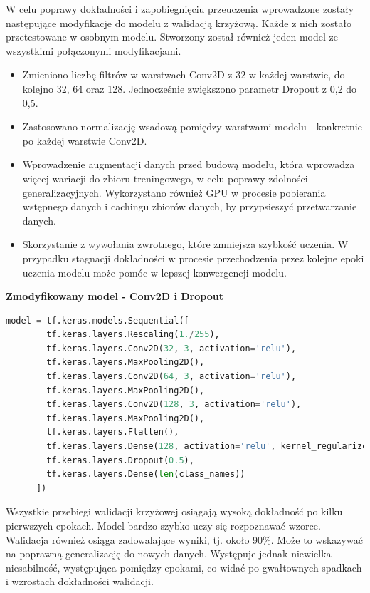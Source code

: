 W celu poprawy dokładności i zapobiegnięciu przeuczenia wprowadzone
zostały następujące modyfikacje do modelu z walidacją krzyżową.
Każde z nich zostało przetestowane w osobnym modelu.
Stworzony został również jeden model ze wszystkimi połączonymi modyfikacjami. 
\begin{itemize}[label=-,labelsep=0.4cm,leftmargin=0.6cm]
    \item Zmieniono liczbę filtrów w warstwach Conv2D z 32 w każdej warstwie, do kolejno 32, 64 oraz 128.
		Jednocześnie zwiększono parametr Dropout z 0,2 do 0,5.
    \item Zastosowano normalizację wsadową pomiędzy warstwami modelu - konkretnie po każdej warstwie Conv2D.
    \item Wprowadzenie augmentacji danych przed budową modelu, która wprowadza więcej wariacji do zbioru treningowego,
		w celu poprawy zdolności generalizacyjnych.
		Wykorzystano również GPU w procesie pobierania wstępnego danych i cachingu zbiorów danych, by przypsieszyć przetwarzanie danych.
	\item Skorzystanie z wywołania zwrotnego, które zmniejsza szybkość uczenia.
		W przypadku stagnacji dokładności w procesie przechodzenia przez kolejne epoki uczenia modelu
		może pomóc w lepszej konwergencji modelu.
\end{itemize}

\textbf{Zmodyfikowany model - Conv2D i Dropout}

\begin{lstlisting}[language=Python,caption=Listing zmodyfikowanego skryptu tworzącego model z walidacją krzyżową - wersja 1,
	label={tests-model-crossval1}]
	model = tf.keras.models.Sequential([
		tf.keras.layers.Rescaling(1./255),
		tf.keras.layers.Conv2D(32, 3, activation='relu'),
		tf.keras.layers.MaxPooling2D(),
		tf.keras.layers.Conv2D(64, 3, activation='relu'),
		tf.keras.layers.MaxPooling2D(),
		tf.keras.layers.Conv2D(128, 3, activation='relu'),
		tf.keras.layers.MaxPooling2D(),
		tf.keras.layers.Flatten(),
		tf.keras.layers.Dense(128, activation='relu', kernel_regularizer=tf.keras.regularizers.l2(0.01)),
		tf.keras.layers.Dropout(0.5),
		tf.keras.layers.Dense(len(class_names))
	  ])
\end{lstlisting}

Wszystkie przebiegi walidacji krzyżowej osiągają wysoką dokładność po kilku pierwszych epokach.
Model bardzo szybko uczy się rozpoznawać wzorce.
Walidacja również osiąga zadowalające wyniki, tj. około 90\%. Może to wskazywać na poprawną generalizację do nowych danych.
Występuje jednak niewielka niesabilność, występująca pomiędzy epokami,
co widać po gwałtownych spadkach i wzrostach dokładności walidacji.


